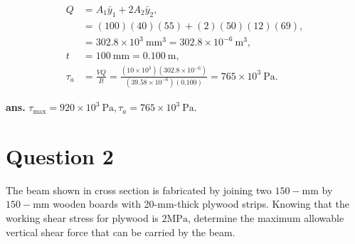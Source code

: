 \documentclass[12pt]{article}
\begin{document}
\[
\begin{aligned}
Q & =A_1 \bar{y}_1+2 A_2 \bar{y}_2, \\
& =(100)(40)(55)+(2)(50)(12)(69), \\
& =302.8 \times 10^3 \mathrm{~mm}^3=302.8 \times 10^{-6} \mathrm{~m}^3, \\
t & =100 \mathrm{~mm}=0.100 \mathrm{~m}, \\
\tau_a & =\frac{V Q}{I t}=\frac{\left(10 \times 10^3\right)\left(302.8 \times 10^{-6}\right)}{\left(39.58 \times 10^{-6}\right)(0.100)}=765 \times 10^3 \mathrm{~Pa}.
\end{aligned}
\]

\AnswerTag

\vfill
\begin{flushright}
\textbf{ans.} \(\tau_{\max }=920 \times 10^3 \mathrm{~Pa}, \tau_a= 765 \times 10^3 \mathrm{~Pa}.\)
\end{flushright}

\newpage
\section*{Question 2}
\begin{q}
The beam shown in cross section is fabricated by joining two \(150-\mathrm{mm}\) by \(150-\mathrm{mm}\) wooden boards with 20-mm-thick plywood strips. Knowing that the working shear stress for plywood is \(2 \mathrm{MPa}\), determine the maximum allowable vertical shear force that can be carried by the beam.
\end{q}
\begin{figure}[!ht]
    \centering
    \caption{}
    \label{fig:enter-label}
\end{figure}
\end{document}
